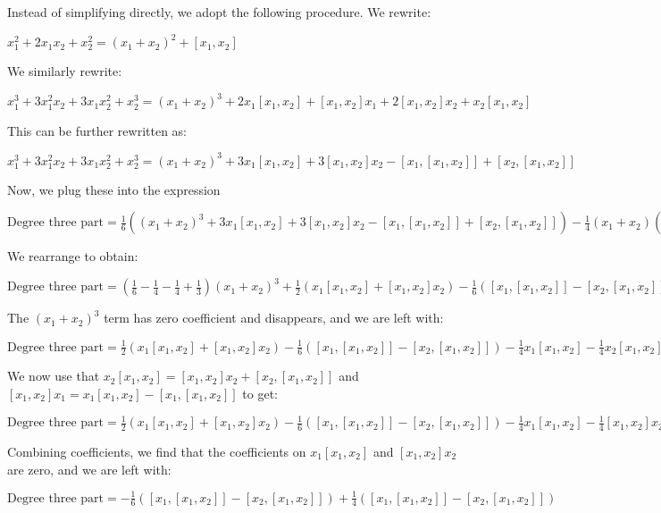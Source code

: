 Instead of simplifying directly, we adopt the following procedure. We rewrite:

$x_1^2 + 2x_1x_2 + x_2^2 = (x_1 + x_2)^2 + [x_1,x_2]$

We similarly rewrite:

$x_1^3 + 3x_1^2x_2 + 3x_1x_2^2 + x_2^3 = (x_1 + x_2)^3 + 2x_1[x_1,x_2] + [x_1,x_2]x_1 + 2[x_1,x_2]x_2 + x_2[x_1,x_2]$

This can be further rewritten as:

$x_1^3 + 3x_1^2x_2 + 3x_1x_2^2 + x_2^3 = (x_1 + x_2)^3 + 3x_1[x_1,x_2] + 3[x_1,x_2]x_2 - [x_1,[x_1,x_2]] + [x_2,[x_1,x_2]]$

Now, we plug these into the expression 

$\mbox{Degree three part} = \frac{1}{6}((x_1 + x_2)^3 + 3x_1[x_1,x_2] + 3[x_1,x_2]x_2 - [x_1,[x_1,x_2]] + [x_2,[x_1,x_2]]) - \frac{1}{4}(x_1 + x_2)((x_1 + x_2)^2 + [x_1,x_2]) - \frac{1}{4}((x_1 + x_2)^2 + [x_1,x_2])(x_1 + x_2) + \frac{1}{3}(x_1 + x_2)^3$

We rearrange to obtain:

$\mbox{Degree three part} = \left(\frac{1}{6} - \frac{1}{4} - \frac{1}{4} + \frac{1}{3}\right)(x_1 + x_2)^3 + \frac{1}{2}(x_1[x_1,x_2] + [x_1,x_2]x_2) - \frac{1}{6}([x_1,[x_1,x_2]] - [x_2,[x_1,x_2]]) - \frac{1}{4}(x_1 + x_2)[x_1,x_2] - \frac{1}{4}([x_1,x_2](x_1 + x_2))$

The $(x_1 + x_2)^3$ term has zero coefficient and disappears, and we are left with:

$\mbox{Degree three part} = \frac{1}{2}(x_1[x_1,x_2] + [x_1,x_2]x_2) - \frac{1}{6}([x_1,[x_1,x_2]] - [x_2,[x_1,x_2]]) - \frac{1}{4}x_1[x_1,x_2] - \frac{1}{4}x_2[x_1,x_2] - \frac{1}{4}[x_1,x_2]x_1 - \frac{1}{4}[x_1,x_2]x_2$

We now use that $x_2[x_1,x_2] = [x_1,x_2]x_2 + [x_2,[x_1,x_2]]$ and $[x_1,x_2]x_1 = x_1[x_1,x_2] - [x_1,[x_1,x_2]]$ to get:

$\mbox{Degree three part} = \frac{1}{2}(x_1[x_1,x_2] + [x_1,x_2]x_2) - \frac{1}{6}([x_1,[x_1,x_2]] - [x_2,[x_1,x_2]]) - \frac{1}{4}x_1[x_1,x_2] - \frac{1}{4}[x_1,x_2]x_2 - \frac{1}{4}[x_2,[x_1,x_2]] - \frac{1}{4}x_1[x_1,x_2] + \frac{1}{4}[x_1,[x_1,x_2]] - \frac{1}{4}[x_1,x_2]x_2$

Combining coefficients, we find that the coefficients on $x_1[x_1,x_2]$ and $[x_1,x_2]x_2$ are zero, and we are left with:

$\mbox{Degree three part} = - \frac{1}{6}([x_1,[x_1,x_2]] - [x_2,[x_1,x_2]]) + \frac{1}{4}([x_1,[x_1,x_2]] - [x_2,[x_1,x_2]])$

